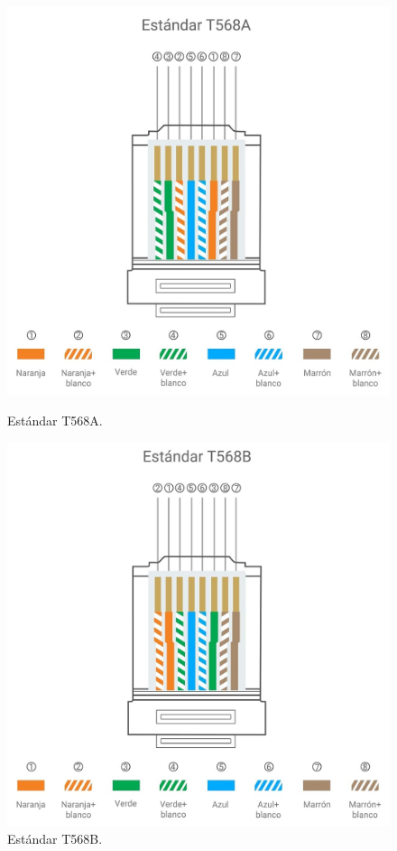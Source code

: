     \begin{figure}[H]
        \centering
        \begin{minipage}[b]{0.45\linewidth}
            \includegraphics[width=\linewidth]{img/T568A.png}
            \caption{Estándar T568A.}
            \label{fig:estandar_t568a}
        \end{minipage}
        \begin{minipage}[b]{0.45\linewidth}
            \includegraphics[width=\linewidth]{img/T568B.png}
            \caption{Estándar T568B.}
            \label{fig:estandar_t568b}
        \end{minipage}
    \end{figure}

